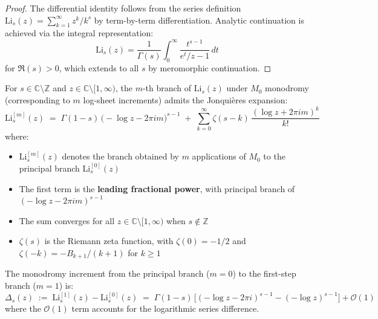 \begin{proof}
The differential identity follows from the series definition $\mathrm{Li}_s(z) = \sum_{k=1}^\infty z^k/k^s$ by term-by-term differentiation. Analytic continuation is achieved via the integral representation:
\[
\mathrm{Li}_s(z) = \frac{1}{\Gamma(s)}\int_0^\infty \frac{t^{s-1}}{e^t/z - 1}\,dt
\]
for $\Re(s) > 0$, which extends to all $s$ by meromorphic continuation\cite{zagier1991polylogarithms}.
\end{proof}

\begin{proposition}\label{prop:monodromy-increment}
For $s\in\mathbb{C}\setminus\mathbb{Z}$ and $z\in\mathbb{C}\setminus[1,\infty)$, the $m$-th branch of $\mathrm{Li}_s(z)$ under $M_0$ monodromy (corresponding to $m$ log-sheet increments) admits the Jonquières expansion:
\begin{equation}\label{eq:jonquieres-expansion}
\mathrm{Li}_s^{[m]}(z) \;=\; \Gamma(1-s)\,\bigl(-\log z - 2\pi im\bigr)^{s-1} \;+\; \sum_{k=0}^{\infty} \zeta(s-k)\,\frac{(\log z + 2\pi im)^k}{k!}
\end{equation}
where:
\begin{itemize}
\item $\mathrm{Li}_s^{[m]}(z)$ denotes the branch obtained by $m$ applications of $M_0$ to the principal branch $\mathrm{Li}_s^{[0]}(z)$
\item The first term is the \textbf{leading fractional power}, with principal branch of $(-\log z - 2\pi im)^{s-1}$
\item The sum converges for all $z\in\mathbb{C}\setminus[1,\infty)$ when $s\notin\mathbb{Z}$
\item $\zeta(s)$ is the Riemann zeta function, with $\zeta(0) = -1/2$ and $\zeta(-k) = -B_{k+1}/(k+1)$ for $k\geq 1$
\end{itemize}

The monodromy increment from the principal branch ($m=0$) to the first-step branch ($m=1$) is:
\begin{equation}\label{eq:monodromy-increment-m1}
\Delta_s(z) \;:=\; \mathrm{Li}_s^{[1]}(z) - \mathrm{Li}_s^{[0]}(z) \;=\; \Gamma(1-s)\,\bigl[(-\log z - 2\pi i)^{s-1} - (-\log z)^{s-1}\bigr] + \mathcal{O}(1)
\end{equation}
where the $\mathcal{O}(1)$ term accounts for the logarithmic series difference.
\end{proposition}

